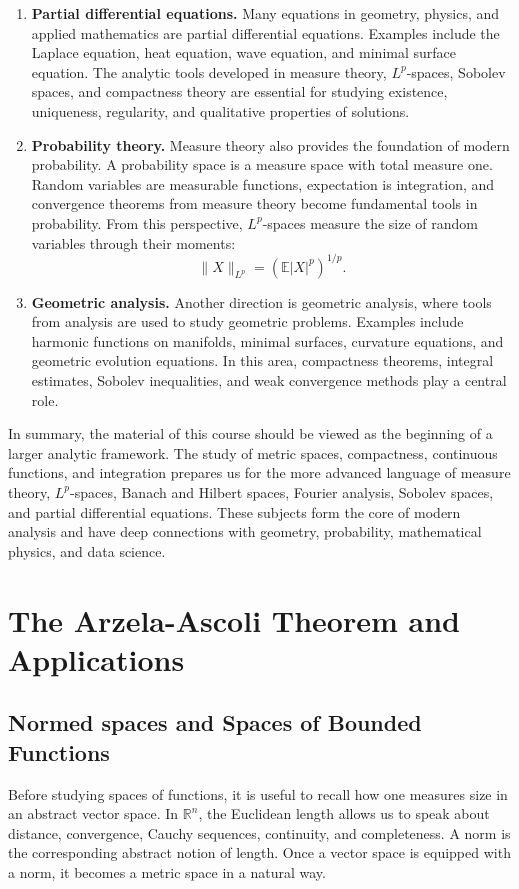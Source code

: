 \begin{enumerate}
    \item \textbf{Partial differential equations.} Many equations in geometry, physics, and applied mathematics are partial differential equations. Examples include the Laplace equation, heat equation, wave equation, and minimal surface equation. The analytic tools developed in measure theory, $L^p$-spaces, Sobolev spaces, and compactness theory are essential for studying existence, uniqueness, regularity, and qualitative properties of solutions.
    
    \item \textbf{Probability theory.} Measure theory also provides the foundation of modern probability. A probability space is a measure space with total measure one. Random variables are measurable functions, expectation is integration, and convergence theorems from measure theory become fundamental tools in probability. From this perspective, $L^p$-spaces measure the size of random variables through their moments:
    \[ \|X\|_{L^{p}} = (\mathbb{E}|X|^{p})^{1/p}. \]
    
    \item \textbf{Geometric analysis.} Another direction is geometric analysis, where tools from analysis are used to study geometric problems. Examples include harmonic functions on manifolds, minimal surfaces, curvature equations, and geometric evolution equations. In this area, compactness theorems, integral estimates, Sobolev inequalities, and weak convergence methods play a central role.
\end{enumerate}

In summary, the material of this course should be viewed as the beginning of a larger analytic framework. The study of metric spaces, compactness, continuous functions, and integration prepares us for the more advanced language of measure theory, $L^p$-spaces, Banach and Hilbert spaces, Fourier analysis, Sobolev spaces, and partial differential equations. These subjects form the core of modern analysis and have deep connections with geometry, probability, mathematical physics, and data science.

\chapter{The Arzela-Ascoli Theorem and Applications}
\section{Normed spaces and Spaces of Bounded Functions}
Before studying spaces of functions, it is useful to recall how one measures size in an abstract vector space. In \(\mathbb{R} ^n\), the Euclidean length allows us to speak about distance, convergence, Cauchy sequences, continuity, and completeness. A norm is the corresponding abstract notion of length. Once a vector space is equipped with a norm, it becomes a metric space in a natural way.

